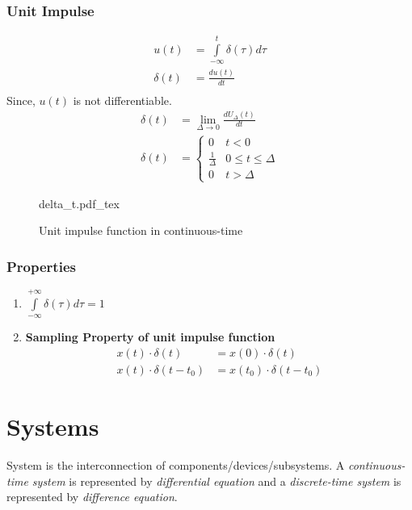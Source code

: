\documentclass[oneside]{book}
\newcommand{\incfig}[1]{%
    {#1.pdf_tex}
}
\begin{document}
\subsubsection{Unit Impulse}
\begin{align*}
  u(t)      & = \int\limits_{-\infty}^{t}\delta(\tau)d\tau \\
  \delta(t) & = \frac{du(t)}{dt}                           \\
\end{align*}
Since, \(u(t)\) is not differentiable.
\begin{align*}
  \delta(t) & = \lim_{\Delta\rightarrow 0}\frac{dU_\Delta(t)}{dt} \\
  \delta(t) & = \begin{cases}
    0                & t<0                  \\
    \frac{1}{\Delta} & 0 \leq t \leq \Delta \\
    0                & t>\Delta
  \end{cases}
\end{align*}
\begin{figure}[ht]
  \centering
  \incfig{delta_t}
  \caption{Unit impulse function in continuous-time}
\end{figure}
\subsubsection{Properties}
\begin{enumerate}
  \item \(\displaystyle\int\limits_{-\infty}^{+\infty}\delta(\tau)d\tau = 1\)
  \item \textbf{Sampling Property of unit impulse function}
        \begin{align*}
          x(t)\cdot\delta(t)     & = x(0)\cdot\delta(t)         \\
          x(t)\cdot\delta(t-t_0) & = x(t_0)\cdot\delta(t - t_0)
        \end{align*}
\end{enumerate}

\section{Systems}
System is the interconnection of components/devices/subsystems. A \textit{continuous-time system} is represented by \textit{differential equation} and a \textit{discrete-time system} is represented by \textit{difference equation}.
\end{document}
